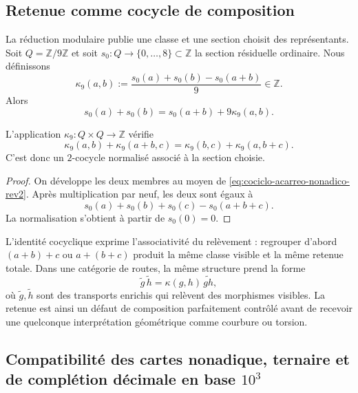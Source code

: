 \subsection{Retenue comme cocycle de composition}

La réduction modulaire publie une classe et une section choisit des représentants.
Soit \(Q=\mathbb Z/9\mathbb Z\) et soit
\(s_0:Q\to\{0,\ldots,8\}\subset\mathbb Z\) la section résiduelle ordinaire.
Nous définissons
\begin{equation}
 \kappa_9(a,b)
 :=\frac{s_0(a)+s_0(b)-s_0(a+b)}{9}\in\mathbb Z.
 \label{eq:cociclo-acarreo-nonadico-rev2}
\end{equation}
Alors
\[
 s_0(a)+s_0(b)=s_0(a+b)+9\kappa_9(a,b).
\]

\begin{proposition}
\label{prop:acarreo-dos-cociclo-rev2}
L’application \(\kappa_9:Q\times Q\to\mathbb Z\) vérifie
\begin{equation}
 \kappa_9(a,b)+\kappa_9(a+b,c)
 =\kappa_9(b,c)+\kappa_9(a,b+c).
 \label{eq:identidad-dos-cociclo-rev2}
\end{equation}
C'est donc un \(2\)-cocycle normalisé associé à la section choisie.
\end{proposition}

\begin{proof}
On développe les deux membres au moyen de
\eqref{eq:cociclo-acarreo-nonadico-rev2}. Après multiplication par neuf, les deux
sont égaux à
\[
 s_0(a)+s_0(b)+s_0(c)-s_0(a+b+c).
\]
La normalisation s'obtient à partir de \(s_0(0)=0\).
\end{proof}

L'identité cocyclique exprime l'associativité du relèvement : regrouper d'abord
\((a+b)+c\) ou \(a+(b+c)\) produit la même classe visible et la même retenue
totale. Dans une catégorie de routes, la même structure prend la forme
\[
 \widetilde g\,\widetilde h
 =\kappa(g,h)\,\widetilde{gh},
\]
où \(\widetilde g,\widetilde h\) sont des transports enrichis qui relèvent des
morphismes visibles. La retenue est ainsi un défaut de composition parfaitement
contrôlé avant de recevoir une quelconque interprétation géométrique comme
courbure ou torsion.

\subsection{Compatibilité des cartes nonadique, ternaire et de complétion décimale en base \texorpdfstring{\(10^3\)}{10^3}}
\label{subsec:compatibilidad-lectores-9-3-1000-rev3}

